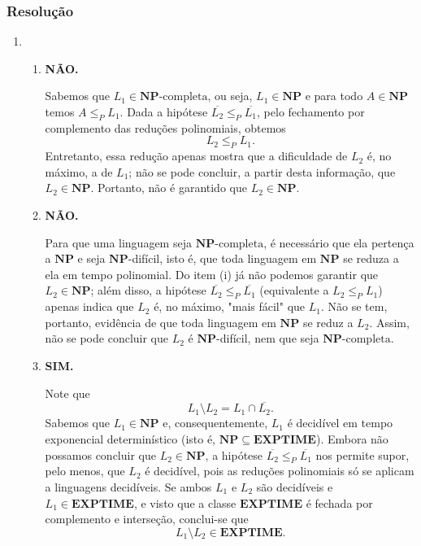 \documentclass[a4paper,12pt]{article}
\begin{document}
\subsubsection*{Resolução}
\begin{enumerate}[label=\alph*)]
  \item
  \begin{enumerate}[label=(\roman*)]
    \item \textbf{NÃO.}

    \vspace{0.3cm}
    Sabemos que $L_1 \in \mathbf{NP}\text{-completa}$, ou seja, $L_1 \in \mathbf{NP}$ e para todo $A \in \mathbf{NP}$ temos $A \leq_P L_1$.  
    Dada a hipótese $\overline{L_2} \leq_P \overline{L_1}$, pelo fechamento por complemento das reduções polinomiais, obtemos 
    $$L_2 \leq_P L_1.$$ 
    Entretanto, essa redução apenas mostra que a dificuldade de $L_2$ é, no máximo, a de $L_1$; não se pode concluir, a partir desta informação, que $L_2 \in \mathbf{NP}$.  
    Portanto, não é garantido que $L_2 \in \mathbf{NP}$.

    \vspace{0.5cm}
    \item \textbf{NÃO.}

    \vspace{0.3cm}
    Para que uma linguagem seja $\mathbf{NP}\text{-completa}$, é necessário que ela pertença a $\mathbf{NP}$ e seja $\mathbf{NP}$-difícil, isto é, que toda linguagem em $\mathbf{NP}$ se reduza a ela em tempo polinomial.  
    Do item (i) já não podemos garantir que $L_2 \in \mathbf{NP}$; além disso, a hipótese $\overline{L_2} \leq_P \overline{L_1}$ (equivalente a $L_2 \leq_P L_1$) apenas indica que $L_2$ é, no máximo, "mais fácil" que $L_1$.  
    Não se tem, portanto, evidência de que toda linguagem em $\mathbf{NP}$ se reduz a $L_2$.  
    Assim, não se pode concluir que $L_2$ é $\mathbf{NP}$-difícil, nem que seja $\mathbf{NP}\text{-completa}$.

    \vspace{0.5cm}
    \item \textbf{SIM.}

    \vspace{0.3cm}
    Note que
    $$L_1 \setminus L_2 = L_1 \cap \overline{L_2}.$$
    Sabemos que $L_1 \in \mathbf{NP}$ e, consequentemente, $L_1$ é decidível em tempo exponencial determinístico (isto é, $\mathbf{NP} \subseteq \mathbf{EXPTIME}$).  
    Embora não possamos concluir que $L_2 \in \mathbf{NP}$, a hipótese $\overline{L_2} \leq_P \overline{L_1}$ nos permite supor, pelo menos, que $L_2$ é decidível, pois as reduções polinomiais só se aplicam a linguagens decidíveis.  
    Se ambos $L_1$ e $L_2$ são decidíveis e $L_1 \in \mathbf{EXPTIME}$, e visto que a classe $\mathbf{EXPTIME}$ é fechada por complemento e interseção, conclui-se que
    $$L_1 \setminus L_2 \in \mathbf{EXPTIME}.$$
  \end{enumerate}
\end{enumerate}
\end{document}
